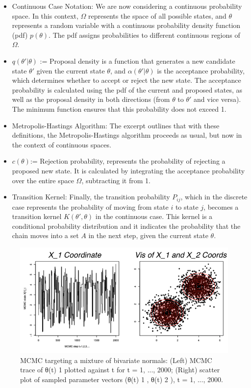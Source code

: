 \documentclass{article}
\begin{document}
\begin{itemize}
    \item Continuous Case Notation: We are now considering a continuous probability space. In this context, \(\Omega\) represents the space of all possible states, and \(\theta\) represents a random variable with a continuous probability density function (pdf) \( p(\theta) \). The pdf assigns probabilities to different continuous regions of \(\Omega\).
    \item  \( q(\theta'|\theta) \) := Proposal density is a function that generates a new candidate state \(\theta'\) given the current state \(\theta\), and \( \alpha(\theta'|\theta) \) is the acceptance probability, which determines whether to accept or reject the new state. The acceptance probability is calculated using the pdf of the current and proposed states, as well as the proposal density in both directions (from \(\theta\) to \(\theta'\) and vice versa). The minimum function ensures that this probability does not exceed 1.
    \item Metropolis-Hastings Algorithm: The excerpt outlines that with these definitions, the Metropolis-Hastings algorithm proceeds as usual, but now in the context of continuous spaces.
    \item  \( c(\theta) \):= Rejection probability, represents the probability of rejecting a proposed new state. It is calculated by integrating the acceptance probability over the entire space \(\Omega\), subtracting it from 1.
    \item Transition Kernel: Finally, the transition probability \( P_{ij} \), which in the discrete case represents the probability of moving from state \( i \) to state \( j \), becomes a transition kernel \( K(\theta',\theta) \) in the continuous case. This kernel is a conditional probability distribution and it indicates the probability that the chain moves into a set \( A \) in the next step, given the current state \( \theta \).
\end{itemize}

\begin{figure}
    \centering
    \includegraphics[width=1\linewidth]{ox-hilary/bayes-methods/figures/Screenshot 2024-01-24 at 22.54.48.png}
    \caption{MCMC targeting a mixture of bivariate normals: (Left) MCMC trace of θ(t)  1 plotted  against t for t = 1, ..., 2000; (Right) scatter plot of sampled parameter vectors (θ(t)  1 , θ(t)  2 ), t =  1, ..., 2000. 
}
\end{figure}
\end{document}
